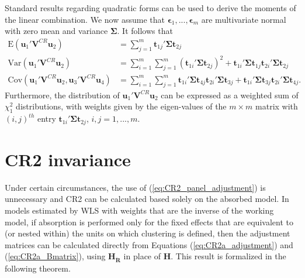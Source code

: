 \documentclass[12pt]{article}\usepackage[]{graphicx}\usepackage[]{color}
\newcommand{\E}{\text{E}}
\newcommand{\Cov}{\text{Cov}}
\newcommand{\Var}{\text{Var}}
\newcommand{\bm}{\mathbf}
\newcommand{\bs}{\boldsymbol}
\begin{document}
Standard results regarding quadratic forms can be used to derive the moments of the linear combination. We now assume that $\bs\epsilon_1,...,\bs\epsilon_m$ are multivariate normal with zero mean and variance $\bs\Sigma$. It follows that 
\begin{align}
\label{eq:CRVE_expectation}
\E\left(\bm{u}_1' \bm{V}^{CR} \bm{u}_2\right) &= \sum_{j=1}^m \bm{t}_{1j}' \bs\Sigma \bm{t}_{2j} \\
\label{eq:CRVE_variance}
\Var\left(\bm{u}_1' \bm{V}^{CR} \bm{u}_2\right) &= \sum_{i=1}^m \sum_{j=1}^m \left(\bm{t}_{1i}' \bs\Sigma \bm{t}_{2j}\right)^2 + \bm{t}_{1i}' \bs\Sigma \bm{t}_{1j} \bm{t}_{2i}' \bs\Sigma \bm{t}_{2j} \\
\label{eq:CRVE_covariance}
\Cov\left(\bm{u}_1' \bm{V}^{CR} \bm{u}_2, \bm{u}_3' \bm{V}^{CR} \bm{u}_4\right) &= \sum_{i=1}^m \sum_{j=1}^m \bm{t}_{1i}' \bs\Sigma \bm{t}_{4j} \bm{t}_{2i}' \bs\Sigma \bm{t}_{3j} + \bm{t}_{1i}' \bs\Sigma \bm{t}_{3j} \bm{t}_{2i}' \bs\Sigma \bm{t}_{4j}.
\end{align}
Furthermore, the distribution of $\bm{u}_1' \bm{V}^{CR} \bm{u}_2$ can be expressed as a weighted sum of $\chi^2_1$ distributions, with weights given by the eigen-values of the $m \times m$ matrix with $\left(i,j\right)^{th}$ entry $\bm{t}_{1i}' \bs\Sigma \bm{t}_{2j}$, $i,j=1,...,m$.

\section{CR2 invariance}
\label{app:theorem1}

Under certain circumstances, the use of (\ref{eq:CR2_panel_adjustment}) is unnecessary and CR2 can be calculated based solely on the absorbed model. In models estimated by WLS with weights that are the inverse of the working model, if absorption is performed only for the fixed effects that are equivalent to (or nested within) the units on which clustering is defined, then the adjustment matrices can be calculated directly from Equations (\ref{eq:CR2a_adjustment}) and (\ref{eq:CR2a_Bmatrix}), using $\bm{H_{\ddot{R}}}$ in place of $\bm{H}$. This result is formalized in the following theorem.
\end{document}
